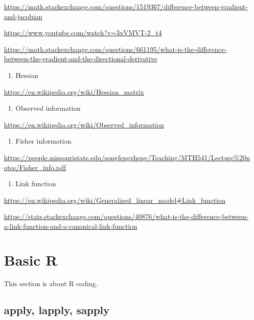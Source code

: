 \documentclass[]{book}
\providecommand{\tightlist}{%
  \setlength{\itemsep}{0pt}\setlength{\parskip}{0pt}}
\begin{document}
\url{https://math.stackexchange.com/questions/1519367/difference-between-gradient-and-jacobian}

\url{https://www.youtube.com/watch?v=3xVMVT-2_t4}

\url{https://math.stackexchange.com/questions/661195/what-is-the-difference-between-the-gradient-and-the-directional-derivative}

\begin{enumerate}
\def\labelenumi{\arabic{enumi}.}
\setcounter{enumi}{4}
\tightlist
\item
  Hessian
\end{enumerate}

\url{https://en.wikipedia.org/wiki/Hessian_matrix}

\begin{enumerate}
\def\labelenumi{\arabic{enumi}.}
\setcounter{enumi}{5}
\tightlist
\item
  Observed information
\end{enumerate}

\url{https://en.wikipedia.org/wiki/Observed_information}

\begin{enumerate}
\def\labelenumi{\arabic{enumi}.}
\setcounter{enumi}{6}
\tightlist
\item
  Fisher information
\end{enumerate}

\url{https://people.missouristate.edu/songfengzheng/Teaching/MTH541/Lecture\%20notes/Fisher_info.pdf}

\begin{enumerate}
\def\labelenumi{\arabic{enumi}.}
\setcounter{enumi}{7}
\tightlist
\item
  Link function
\end{enumerate}

\url{https://en.wikipedia.org/wiki/Generalized_linear_model\#Link_function}

\url{https://stats.stackexchange.com/questions/40876/what-is-the-difference-between-a-link-function-and-a-canonical-link-function}

\chapter{Basic R}\label{basic-r}

This section is about R coding.

\section{apply, lapply, sapply}\label{apply-lapply-sapply}
\end{document}
